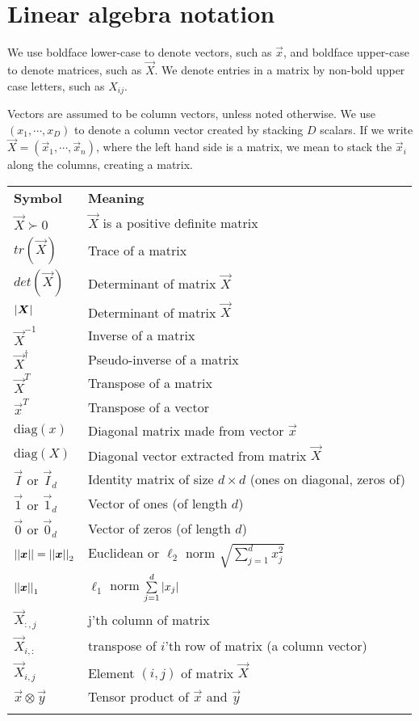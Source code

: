 \section*{Linear algebra notation}
We use boldface lower-case to denote vectors, such as $\vec{x}$, and boldface upper-case to denote matrices, such as $\vec{X}$. We denote entries in a matrix by non-bold upper case letters, such as $X_{ij}$. 

Vectors are assumed to be column vectors, unless noted otherwise. We use $(x_1,\cdots,x_D)$ to denote a column vector created by stacking $D$ scalars. If we write $\vec{X}=(\vec{x}_1,\cdots,\vec{x}_n)$, where the left hand side is a matrix, we mean to stack the $\vec{x}_i$ along the columns, creating a matrix. 

\begin{longtable}{ll}
\hline\noalign{\smallskip}
\textbf{Symbol} & \textbf{Meaning} \\
\noalign{\smallskip}\hline\noalign{\smallskip}
$\vec{X} \succ 0$ & $\vec{X}$ is a positive definite matrix\\
$tr(\vec{X})$ & Trace of a matrix\\
$det(\vec{X})$ & Determinant of matrix $\vec{X}$\\
$\abs{\vec{X}}$ & Determinant of matrix $\vec{X}$\\
$\vec{X}^{-1}$ & Inverse of a matrix\\
$\vec{X}^{\dagger}$ & Pseudo-inverse of a matrix\\
$\vec{X}^T$ & Transpose of a matrix\\
$\vec{x}^T$ & Transpose of a vector\\
$\mathrm{diag}(x)$ & Diagonal matrix made from vector $\vec{x}$\\
$\mathrm{diag}(X)$ & Diagonal vector extracted from matrix $\vec{X}$\\
$\vec{I}$ or $\vec{I}_d$ & Identity matrix of size $d \times d$ (ones on diagonal, zeros of)\\
$\vec{1}$ or $\vec{1}_d$ & Vector of ones (of length $d$)\\
$\vec{0}$ or $\vec{0}_d$ & Vector of zeros (of length $d$)\\
$\abs{\abs{\vec{x}}}=\abs{\abs{\vec{x}}}_2$ & Euclidean or $\ell_2$ norm $\sqrt{\sum\limits_{j=1}^{d} x_j^2}$\\
$\abs{\abs{\vec{x}}}_1$ & $\ell_1$ norm $\sum\limits_{j=1}^{d} \left\lvert x_j\right\rvert$\\
$\vec{X}_{:,j}$ & j'th column of matrix\\
$\vec{X}_{i,:}$ & transpose of $i$'th row of matrix (a column vector)\\
$\vec{X}_{i,j}$ & Element $(i,j)$ of matrix $\vec{X}$ \\
$\vec{x} \otimes \vec{y}$ & Tensor product of $\vec{x}$ and $\vec{y}$\\
\noalign{\smallskip}\hline\noalign{\smallskip}
\end{longtable}


